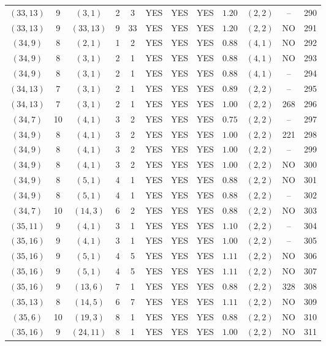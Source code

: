 \begin{longtable}{|c|c|c|c|c|c|c|c|c|c|c|c|}
$(33,13)$ & 9 & $(3,1)$ & 2 & 3 & YES & YES & YES & $1.20$ & $(2,2)$ & -- & 290\\
$(33,13)$ & 9 & $(33,13)$ & 9 & 33 & YES & YES & YES & $1.20$ & $(2,2)$ & NO & 291\\
$(34,9)$ & 8 & $(2,1)$ & 1 & 2 & YES & YES & YES & $0.88$ & $(4,1)$ & NO & 292\\
$(34,9)$ & 8 & $(3,1)$ & 2 & 1 & YES & YES & YES & $0.88$ & $(4,1)$ & NO & 293\\
$(34,9)$ & 8 & $(3,1)$ & 2 & 1 & YES & YES & YES & $0.88$ & $(4,1)$ & -- & 294\\
$(34,13)$ & 7 & $(3,1)$ & 2 & 1 & YES & YES & YES & $0.89$ & $(2,2)$ & -- & 295\\
$(34,13)$ & 7 & $(3,1)$ & 2 & 1 & YES & YES & YES & $1.00$ & $(2,2)$ & 268 & 296\\
$(34,7)$ & 10 & $(4,1)$ & 3 & 2 & YES & YES & YES & $0.75$ & $(2,2)$ & -- & 297\\
$(34,9)$ & 8 & $(4,1)$ & 3 & 2 & YES & YES & YES & $1.00$ & $(2,2)$ & 221 & 298\\
$(34,9)$ & 8 & $(4,1)$ & 3 & 2 & YES & YES & YES & $1.00$ & $(2,2)$ & -- & 299\\
$(34,9)$ & 8 & $(4,1)$ & 3 & 2 & YES & YES & YES & $1.00$ & $(2,2)$ & NO & 300\\
$(34,9)$ & 8 & $(5,1)$ & 4 & 1 & YES & YES & YES & $0.88$ & $(2,2)$ & NO & 301\\
$(34,9)$ & 8 & $(5,1)$ & 4 & 1 & YES & YES & YES & $0.88$ & $(2,2)$ & -- & 302\\
$(34,7)$ & 10 & $(14,3)$ & 6 & 2 & YES & YES & YES & $0.88$ & $(2,2)$ & NO & 303\\
$(35,11)$ & 9 & $(4,1)$ & 3 & 1 & YES & YES & YES & $1.10$ & $(2,2)$ & -- & 304\\
$(35,16)$ & 9 & $(4,1)$ & 3 & 1 & YES & YES & YES & $1.00$ & $(2,2)$ & -- & 305\\
$(35,16)$ & 9 & $(5,1)$ & 4 & 5 & YES & YES & YES & $1.11$ & $(2,2)$ & NO & 306\\
$(35,16)$ & 9 & $(5,1)$ & 4 & 5 & YES & YES & YES & $1.11$ & $(2,2)$ & NO & 307\\
$(35,16)$ & 9 & $(13,6)$ & 7 & 1 & YES & YES & YES & $0.88$ & $(2,2)$ & 328 & 308\\
$(35,13)$ & 8 & $(14,5)$ & 6 & 7 & YES & YES & YES & $1.11$ & $(2,2)$ & NO & 309\\
$(35,6)$ & 10 & $(19,3)$ & 8 & 1 & YES & YES & YES & $0.88$ & $(2,2)$ & NO & 310\\
$(35,16)$ & 9 & $(24,11)$ & 8 & 1 & YES & YES & YES & $1.00$ & $(2,2)$ & NO & 311\\

\end{longtable}

